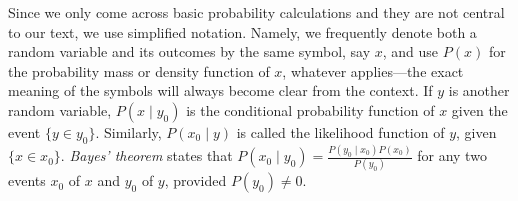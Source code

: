 Since we only come across basic probability calculations and they are not central to our text, we use simplified notation. Namely, we frequently denote both a random variable and its outcomes by the same symbol, say $x$, and use $P(x)$ for the probability mass or density function of $x$, whatever applies—the exact meaning of the symbols will always become clear from the context. If $y$ is another random variable, $P(x∣y_0)$ is the conditional probability function of $x$ given the event $\{y∈y_0\}$. Similarly, $P(x_0∣y)$ is called the likelihood function of $y$, given $\{x∈x_0\}$. \emph{Bayes' theorem} states that $P(x_0∣y_0) = \frac{P(y_0∣x_0)P(x_0)}{P(y_0)}$ for any two events $x_0$ of $x$ and $y_0$ of $y$, provided $P(y_0) ≠ 0$.